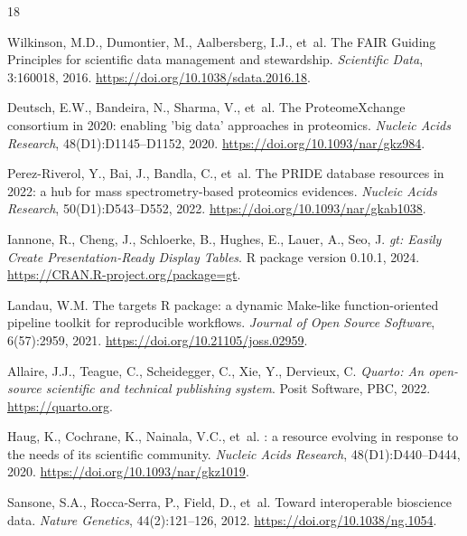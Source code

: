 \documentclass[11pt,twoside,openright]{book}
\begin{document}
\FloatBarrier
\begin{thebibliography}{18}

Wilkinson, M.D., Dumontier, M., Aalbersberg, I.J., et~al.
\newblock The {FAIR} Guiding Principles for scientific data management and stewardship.
\newblock \emph{Scientific Data}, 3:160018, 2016.
\newblock \url{https://doi.org/10.1038/sdata.2016.18}.

Deutsch, E.W., Bandeira, N., Sharma, V., et~al.
\newblock The {ProteomeXchange} consortium in 2020: enabling 'big data' approaches in proteomics.
\newblock \emph{Nucleic Acids Research}, 48(D1):D1145--D1152, 2020.
\newblock \url{https://doi.org/10.1093/nar/gkz984}.

Perez-Riverol, Y., Bai, J., Bandla, C., et~al.
\newblock The {PRIDE} database resources in 2022: a hub for mass spectrometry-based proteomics evidences.
\newblock \emph{Nucleic Acids Research}, 50(D1):D543--D552, 2022.
\newblock \url{https://doi.org/10.1093/nar/gkab1038}.

Iannone, R., Cheng, J., Schloerke, B., Hughes, E., Lauer, A., Seo, J.
\newblock \emph{gt: Easily Create Presentation-Ready Display Tables}.
\newblock R package version 0.10.1, 2024.
\newblock \url{https://CRAN.R-project.org/package=gt}.

Landau, W.M.
\newblock The targets {R} package: a dynamic Make-like function-oriented pipeline toolkit for reproducible workflows.
\newblock \emph{Journal of Open Source Software}, 6(57):2959, 2021.
\newblock \url{https://doi.org/10.21105/joss.02959}.

Allaire, J.J., Teague, C., Scheidegger, C., Xie, Y., Dervieux, C.
\newblock \emph{Quarto: An open-source scientific and technical publishing system}.
\newblock Posit Software, PBC, 2022.
\newblock \url{https://quarto.org}.

Haug, K., Cochrane, K., Nainala, V.C., et~al.
: a resource evolving in response to the needs of its scientific community.
\newblock \emph{Nucleic Acids Research}, 48(D1):D440--D444, 2020.
\newblock \url{https://doi.org/10.1093/nar/gkz1019}.

Sansone, S.A., Rocca-Serra, P., Field, D., et~al.
\newblock Toward interoperable bioscience data.
\newblock \emph{Nature Genetics}, 44(2):121--126, 2012.
\newblock \url{https://doi.org/10.1038/ng.1054}.


\end{thebibliography}
\end{document}
